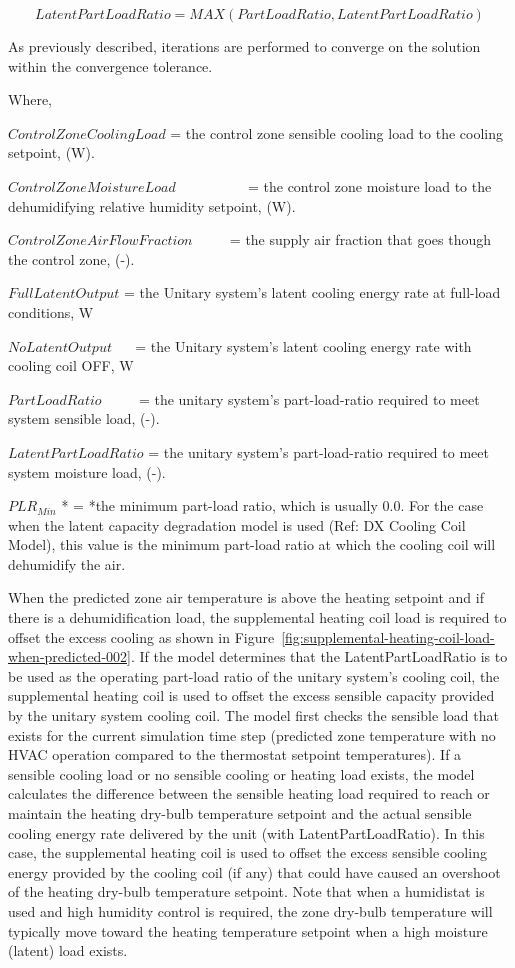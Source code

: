 \begin{equation}
LatentPartLoadRatio = MAX\left( {PartLoadRatio,LatentPartLoadRatio} \right)
\end{equation}

As previously described, iterations are performed to converge on the solution within the convergence tolerance.

Where,

\(ControlZoneCoolingLoad\) = the control zone sensible cooling load to the cooling setpoint, (W).

\(ControlZoneMoistureLoad\) ~~~~~~~~~ = the control zone moisture load to the dehumidifying relative humidity setpoint, (W).

\(ControlZoneAirFlowFraction\) ~~~~ = the supply air fraction that goes though the control zone, (-).

\(FullLatentOutput\) = the Unitary system's latent cooling energy rate at full-load conditions, W

\(NoLatentOutput\) ~~ = the Unitary system's latent cooling energy rate with cooling coil OFF, W

\(PartLoadRatio\) ~~~~ = the unitary system's part-load-ratio required to meet system sensible load, (-).

\(LatentPartLoadRatio\) = the unitary system's part-load-ratio required to meet system moisture load, (-).

\(PL{R_{Min}}\) * = *the minimum part-load ratio, which is usually 0.0. For the case when the latent capacity degradation model is used (Ref: DX Cooling Coil Model), this value is the minimum part-load ratio at which the cooling coil will dehumidify the air.

When the predicted zone air temperature is above the heating setpoint and if there is a dehumidification load, the supplemental heating coil load is required to offset the excess cooling as shown in Figure~\ref{fig:supplemental-heating-coil-load-when-predicted-002}. If the model determines that the LatentPartLoadRatio is to be used as the operating part-load ratio of the unitary system's cooling coil, the supplemental heating coil is used to offset the excess sensible capacity provided by the unitary system cooling coil. The model first checks the sensible load that exists for the current simulation time step (predicted zone temperature with no HVAC operation compared to the thermostat setpoint temperatures). If a sensible cooling load or no sensible cooling or heating load exists, the model calculates the difference between the sensible heating load required to reach or maintain the heating dry-bulb temperature setpoint and the actual sensible cooling energy rate delivered by the unit (with LatentPartLoadRatio). In this case, the supplemental heating coil is used to offset the excess sensible cooling energy provided by the cooling coil (if any) that could have caused an overshoot of the heating dry-bulb temperature setpoint. Note that when a humidistat is used and high humidity control is required, the zone dry-bulb temperature will typically move toward the heating temperature setpoint when a high moisture (latent) load exists.

